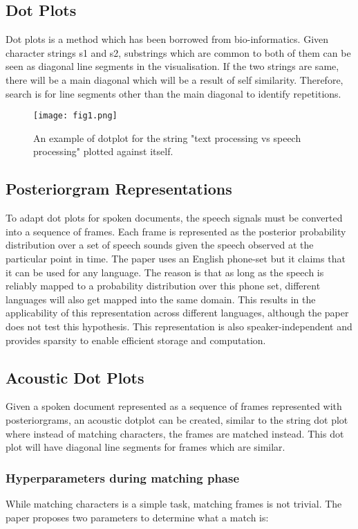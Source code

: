 \documentclass[a4paper]{article}
\begin{document}
\subsection{Dot Plots}
Dot plots is a method which has been borrowed from bio-informatics. Given character strings s1 and s2, substrings which are common to both of them can be seen as diagonal line segments in the visualisation. If the two strings are same, there will be a main diagonal which will be a result of self similarity. Therefore, search is for line segments other than the main diagonal to identify repetitions.

\begin{figure}[t]
  \centering
  \texttt{[image: fig1.png]}
  \caption{An example of dotplot for the string "text processing vs speech processing" plotted against itself.}
  \label{fig:dotplot}
\end{figure}

\subsection{Posteriorgram Representations}
To adapt dot plots for spoken documents, the speech signals must be converted into a sequence of frames. Each frame is represented as the posterior probability distribution over a set of speech sounds given the speech observed at the particular point in time. The paper uses an English phone-set but it claims that it can be used for any language. The reason is that as long as the speech is reliably mapped to a probability distribution over this phone set, different languages will also get mapped into the same domain. This results in the applicability of this representation across different languages, although the paper does not test this hypothesis. This representation is also speaker-independent and provides sparsity to enable efficient storage and computation.

\subsection{Acoustic Dot Plots}
Given a spoken document represented as a sequence of frames represented with posteriorgrams, an acoustic dotplot can be created, similar to the string dot plot where instead of matching characters, the frames are matched instead. This dot plot will have diagonal line segments for frames which are similar.

\subsubsection{Hyperparameters during matching phase}
While matching characters is a simple task, matching frames is not trivial. The paper proposes two parameters to determine what a match is:
\end{document}
